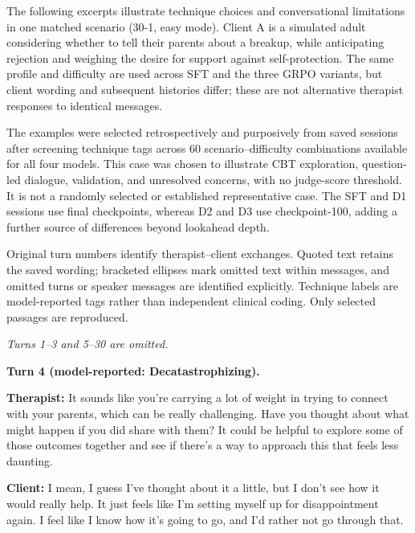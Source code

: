 The following excerpts illustrate technique choices and conversational limitations in one matched scenario (30-1, easy mode). Client A is a simulated adult considering whether to tell their parents about a breakup, while anticipating rejection and weighing the desire for support against self-protection. The same profile and difficulty are used across SFT and the three GRPO variants, but client wording and subsequent histories differ; these are not alternative therapist responses to identical messages.

The examples were selected retrospectively and purposively from saved sessions after screening technique tags across 60 scenario--difficulty combinations available for all four models. This case was chosen to illustrate CBT exploration, question-led dialogue, validation, and unresolved concerns, with no judge-score threshold. It is not a randomly selected or established representative case. The SFT and D1 sessions use final checkpoints, whereas D2 and D3 use checkpoint-100, adding a further source of differences beyond lookahead depth.

Original turn numbers identify therapist--client exchanges. Quoted text retains the saved wording; bracketed ellipses mark omitted text within messages, and omitted turns or speaker messages are identified explicitly. Technique labels are model-reported tags rather than independent clinical coding. Only selected passages are reproduced.

\begin{tcolorbox}[breakable,colback=gray!5,colframe=gray!45,
    boxrule=0.5pt,arc=2mm,left=3mm,right=3mm,top=2mm,bottom=2mm,
    title={SFT reference: exploring anticipated outcomes} ,colbacktitle=gray!15,coltitle=black]
\small\linespread{1.15}\selectfont
\textit{Turns 1--3 and 5--30 are omitted.}\par\medskip
\textbf{Turn 4 (model-reported: Decatastrophizing).}\par
\textbf{Therapist:} It sounds like you’re carrying a lot of weight in trying to connect with your parents, which can be really challenging. Have you thought about what might happen if you did share with them? It could be helpful to explore some of those outcomes together and see if there’s a way to approach this that feels less daunting.\par
\textbf{Client:} I mean, I guess I’ve thought about it a little, but I don’t see how it would really help. It just feels like I'm setting myself up for disappointment again. I feel like I know how it’s going to go, and I’d rather not go through that.\par\medskip
\end{tcolorbox}

